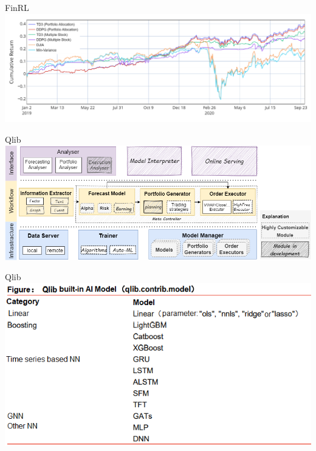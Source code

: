 \documentclass[aspectratio=169,11pt]{beamer}
\begin{document}
    \begin{frame}{FinRL}
        \centering
        \includegraphics[width=\linewidth]{performance.png}
    \end{frame}
    \begin{frame}{Qlib}
        \centering
        \includegraphics[width=\linewidth]{qlib_framework.png}
    \end{frame}
    \begin{frame}{Qlib}
        \centering
        \includegraphics[width=0.8\linewidth]{qlib_model.png}
    \end{frame}
\end{document}
